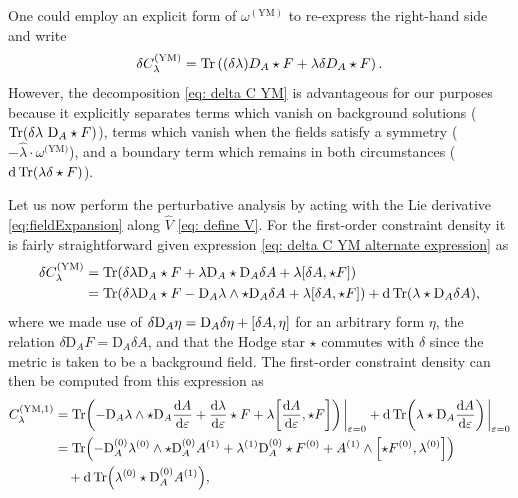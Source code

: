 \documentclass[]{jkpaper}
\theoremstyle{plain}
\theoremstyle{definition}
\newcommand{\eps}{\varepsilon}
\newcommand{\fins}{\cdot}
\def\extd{\mathrm {d}}
\newcommand{\fd}{\delta}
\newcommand{\DD}[1]{\text{D}_A#1}
\begin{document}
One could employ an explicit form of $\omega^{(\text{YM})}$ to re-express the right-hand side and write
\begin{equation}\label{eq: delta C YM alternate expression}
    \delta C_{\lambda}^{\text{(YM)}}=\Tr\left((\delta\lambda) D_A\star F+\lambda\delta D_A\star F\right).
\end{equation}
However, the decomposition \eqref{eq: delta C YM} is advantageous for our purposes because it explicitly separates terms which vanish on background solutions ($\Tr(\delta\lambda ~\DD \star F)$), terms which vanish when the fields satisfy a symmetry ($-\hat{\lambda}\fins \omega^{\text{(YM)}}$), and a boundary term which remains in both circumstances ($\extd \Tr(\lambda \fd \star F)$).

Let us now perform the perturbative analysis by acting with the Lie derivative \eqref{eq:fieldExpansion} along $\hat{V}$ \eqref{eq: define V}. For the first-order constraint density it is fairly straightforward given expression \eqref{eq: delta C YM alternate expression} as 
\begin{align}
    \delta C_\lambda^{(\text{YM)}} &= \Tr(\delta \lambda \DD \star F + \lambda \DD \star \DD \delta A + \lambda \comm{\delta A}{\star F}) \nonumber \\
    &= \Tr(\delta \lambda \DD \star F - \DD \lambda \wedge \star \DD \delta A + \lambda \comm{\delta A}{\star F}) + \dd \Tr(\lambda \star \DD \delta A),
\end{align}
where we made use of $\delta \DD \eta = \DD \delta \eta + \comm{\delta A}{\eta}$ for an arbitrary form $\eta$, the relation $\delta \DD F = \DD \delta A$, and that the Hodge star $\star$ commutes with $\delta$ since the metric is taken to be a background field. The first-order constraint density can then be computed from this expression as 
\begin{equation}
    \begin{split}
        \label{eq:YMfirstConstraintCalc}
        C_\lambda^{(\text{YM},1)}
        &= \Tr(-\DD \lambda \wedge \star \DD \dv{A}{\eps} + \dv{\lambda}{\eps} \star F + \lambda \comm{\dv{A}{\eps}}{\star F} ) \eval_{\eps = 0} + \dd \Tr(\lambda \star \DD \dv{A}{\eps}) \eval_{\eps = 0}
        \\
        &= \Tr(-\DD^{(0)} \lambda^{(0)} \wedge \star \DD^{(0)} A^{(1)} + \lambda^{(1)}\DD^{(0)} \star F^{(0)} + A^{(1)} \wedge \comm{\star F^{(0)}}{\lambda^{(0)}} ) \\ 
        &\hspace{10pt} + \dd \Tr(\lambda^{(0)} \star \DD^{(0)} A^{(1)}),
    \end{split}
\end{equation}
\end{document}
